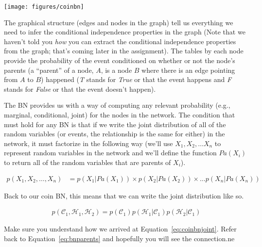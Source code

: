 \documentclass[assignment02_Solutions]{subfiles}
\begin{document}
\begin{center}
\texttt{[image: figures/coinbn]}
\end{center}

The graphical structure (edges and nodes in the graph) tell us everything we need to infer the conditional independence properties in the graph (Note that we haven't told you \emph{how} you can extract the conditional independence properties from the graph; that's coming later in the assignment).  The tables by each node provide the probability of the event conditioned on whether or not the node's parents (a ``parent'' of a node, $A$, is a node $B$ where there is an edge pointing from $A$ to $B$) happened (\emph{T} stands for \emph{True} or that the event happens and \emph{F} stands for \emph{False} or that the event doesn't happen).

The BN provides us with a way of computing any relevant probability (e.g., marginal, conditional, joint) for the nodes in the network.  The condition that must hold for any BN is that if we write the joint distribution of all of the random variables (or events, the relationship is the same for either) in the network, it must factorize in the following way (we'll use $X_1, X_2, \ldots X_n$ to represent random variables in the network and we'll define the function $Pa(X_i)$ to return all of the random variables that are parents of $X_i$).

\begin{align}
p(X_1, X_2, \ldots, X_n) &= p(X_1 | Pa(X_1)) \times p(X_2 | Pa(X_2)) \times \ldots p(X_n | Pa(X_n)) \label{eq:bnparents}
\end{align}

Back to our coin BN, this means that we can write the joint distribution like so.

\begin{align}
p(\mathcal{C}_1, \mathcal{H}_1, \mathcal{H}_2) = p(\mathcal{C}_1) p(\mathcal{H}_1 | \mathcal{C}_1) p(\mathcal{H}_2 | \mathcal{C}_1) \label{eq:coinbnjoint}
\end{align}

\begin{understandingcheck}
Make sure you understand how we arrived at Equation~\ref{eq:coinbnjoint}.  Refer back to Equation~\ref{eq:bnparents} and hopefully you will see the connection.ne
\end{understandingcheck}
\end{document}
